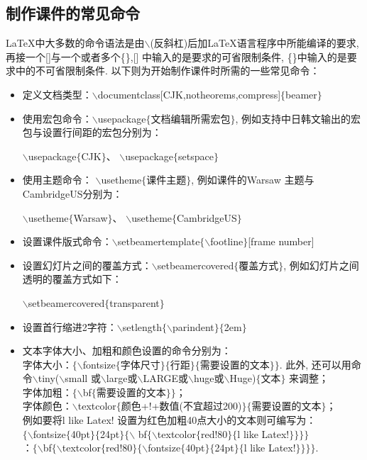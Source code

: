 \subsection{制作课件的常见命令}
\LaTeX{}中大多数的命令语法是由$\backslash$(反斜杠)后加\LaTeX{}语言程序中所能编译的要求, 再接一个[]与一个或者多个\{\},[] 中输入的是要求的可省限制条件, \{\}中输入的是要求中的不可省限制条件. 以下则为开始制作课件时所需的一些常见命令：
\begin{itemize}
\item 定义文档类型：$\backslash$documentclass[CJK,notheorems,compress]$\{$beamer$\}$
    \item 使用宏包命令：$\backslash$usepackage$\{$文档编辑所需宏包$\}$, 例如支持中日韩文输出的宏包与设置行间距的宏包分别为：\\
 \centerline{
 $\backslash$usepackage$\{$CJK$\}${}、
 $\backslash$usepackage$\{$setspace$\}$
 }
    \item 使用主题命令：
$\backslash$usetheme$\{$课件主题$\}$, 例如课件的Warsaw 主题与CambridgeUS分别为：\\
\centerline{
$\backslash$usetheme$\{$Warsaw$\}${}、
$\backslash$usetheme$\{$CambridgeUS$\}$}
    \item 设置课件版式命令：$\backslash$setbeamertemplate$\{\backslash$footline$\}$[frame number]
    \item 设置幻灯片之间的覆盖方式：$\backslash$setbeamercovered$\{$覆盖方式$\}$, 例如幻灯片之间透明的覆盖方式如下：\\
    \centerline{
        $\backslash$setbeamercovered$\{$transparent$\}$}
    \item 设置首行缩进2字符：$\backslash$setlength$\{\backslash$parindent$\}\{$2em$\}$
    \item 文本字体大小、加粗和颜色设置的命令分别为：\\
字体大小：$\{\backslash$fontsize$\{$字体尺寸$\}\{$行距$\}\{$需要设置的文本$\}\}$. 此外, 还可以用命令$\backslash$tiny($\backslash$small 或$\backslash$large或$\backslash$LARGE或$\backslash$huge或$\backslash$Huge)$\{$文本$\}$ 来调整；\\
字体加粗：$\{\backslash$bf$\{$需要设置的文本$\}\}$；\\
字体颜色：$\backslash$textcolor$\{$颜色+!+数值(不宜超过200)$\} \{$需要设置的文本$\}$；\\
例如要将l like Latex! 设置为红色加粗40点大小的文本则可编写为：\\
$\{\backslash$fontsize$\{$40pt$\}\{$24pt$\}\{\backslash$ bf$\{\backslash$textcolor$\{$red!80$\}\{$l like Latex!$\}\}\}\}$\\
：$\{\backslash$bf$\{\backslash$textcolor$\{$red!80$\}\{\backslash$fontsize$\{$40pt$\}\{$24pt$\}\{$l like Latex!$\}\}\}\}$.
    \end{itemize}


